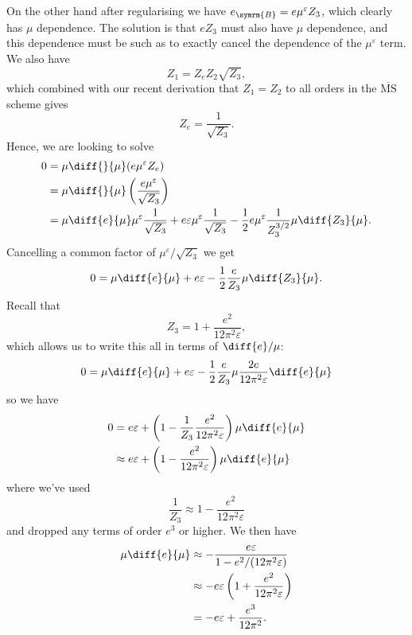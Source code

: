 \documentclass[fleqn]{NotesClass}
\newcommand{\MSbar}{\ensuremath{\overline{\text{MS}}}}
\newcommand{\bare}{\symrm{B}}
\begin{document}
    On the other hand after regularising we have \(e_{\bare} = e\mu^\varepsilon Z_3\), which clearly has \(\mu\) dependence.
    The solution is that \(eZ_3\) must also have \(\mu\) dependence, and this dependence must be such as to exactly cancel the dependence of the \(\mu^\varepsilon\) term.
    We also have
    \begin{equation}
        Z_1 = Z_e Z_2 \sqrt{Z_3},
    \end{equation}
    which combined with our recent derivation that \(Z_1 = Z_2\) to all orders in the \MSbar{} scheme gives
    \begin{equation}
        Z_e = \frac{1}{\sqrt{Z_3}}.
    \end{equation}
    Hence, we are looking to solve
    \begin{align}
        0 &= \mu \diff{}{\mu}(e\mu^\varepsilon Z_e)\\
        &= \mu \diff{}{\mu}\left( \frac{e\mu^\varepsilon}{\sqrt{Z_3}} \right)\\
        &= \mu \diff{e}{\mu} \mu^\varepsilon \frac{1}{\sqrt{Z_3}} + e\varepsilon \mu^\varepsilon \frac{1}{\sqrt{Z_3}} - \frac{1}{2} e\mu^\varepsilon \frac{1}{Z_3^{3/2}} \mu \diff{Z_3}{\mu}.
    \end{align}
    Cancelling a common factor of \(\mu^\varepsilon / \sqrt{Z_3}\) we get
    \begin{equation}
        0 = \mu \diff{e}{\mu} + e\varepsilon - \frac{1}{2} \frac{e}{Z_3} \mu \diff{Z_3}{\mu}.
    \end{equation}
    Recall that
    \begin{equation}
        Z_3 = 1 + \frac{e^2}{12\pi^2\varepsilon},
    \end{equation}
    which allows us to write this all in terms of \(\diff{e}/{\mu}\):
    \begin{equation}
        0 = \mu \diff{e}{\mu} + e\varepsilon - \frac{1}{2} \frac{e}{Z_3} \mu \frac{2e}{12\pi^2\varepsilon} \diff{e}{\mu}
    \end{equation}
    so we have
    \begin{align}
        0 &= e\varepsilon + \left( 1 - \frac{1}{Z_3}\frac{e^2}{12\pi^2\varepsilon} \right) \mu \diff{e}{\mu}\\
        &\approx e\varepsilon + \left( 1 - \frac{e^2}{12\pi^2\varepsilon} \right) \mu \diff{e}{\mu}
    \end{align}
    where we've used
    \begin{equation}
        \frac{1}{Z_3} \approx 1 - \frac{e^2}{12\pi^2\varepsilon}
    \end{equation}
    and dropped any terms of order \(e^3\) or higher.
    We then have
    \begin{align}
        \mu \diff{e}{\mu} &\approx -\frac{e\varepsilon}{1 - e^2/(12\pi^2\varepsilon)}\\
        &\approx -e\varepsilon\left( 1 + \frac{e^2}{12\pi^2\varepsilon} \right)\\
        &= -e\varepsilon + \frac{e^3}{12\pi^2}.
    \end{align}
    
\end{document}
